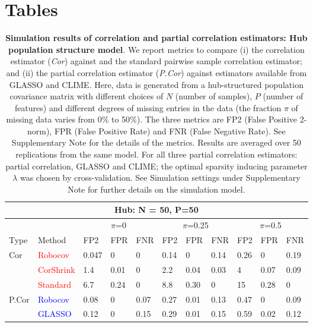 \newpage
\section*{Tables}

\begin{longtable}[c]{|p{1cm}|p{1.5cm}|p{1cm}|p{1.0cm}|p{1.0cm}|p{1.0cm}|p{1.0cm}|p{1.0cm}|p{1.0cm}|p{1.0cm}|p{1.0cm}|}
\caption{\textbf{Simulation results of correlation and partial correlation estimators: Hub population structure model}. We report metrics to compare (i) the  \Robocov{} correlation estimator (\textit{Cor}) against \CorShrink{} and the standard pairwise sample correlation estimator; and (ii) the \Robocov{} partial correlation estimator (\textit{P.Cor})  against estimators available from GLASSO and 
CLIME. Here, data is generated from a hub-structured population covariance matrix with different choices of $N$ (number of samples), $P$ (number of features) and different degrees of missing entries in the data (the fraction $\pi$ of missing data varies from 0$\%$ to 50$\%$). The three metrics are FP2 (False Positive 2-norm), FPR (False Positive Rate) and FNR (False Negative Rate). See Supplementary Note for the details of the metrics. Results are averaged over 50 replications from the same model. For all three partial correlation estimators:  \Robocov{} partial correlation, GLASSO and CLIME; the optimal sparsity inducing parameter $\lambda$ was chosen by cross-validation. See Simulation settings under Supplementary Note for further details on the simulation model.}
\label{tab:tab1} \\ \hline
\multicolumn{11}{|c|}{Hub: N = 50, P=50} \\ \hline
& & \multicolumn{3}{c|}{$\pi$=0} & \multicolumn{3}{c|}{$\pi$=0.25} & \multicolumn{3}{c|}{$\pi$=0.5} \\ \hline
 Type & Method & FP2 & FPR & FNR &  FP2 & FPR & FNR & FP2 & FPR & FNR \\ \hline 
\multirow{ 3}{*}{Cor} & \textcolor{red}{Robocov} & 0.047 &   0 &   0  & 0.14 &   0 & 0.14 & 0.26 &   0 & 0.19 \\
& \textcolor{red}{CorShrink} & 1.4 & 0.01 &  0 & 2.2 & 0.04 & 0.03 &  4 & 0.07 & 0.09 \\
& \textcolor{red}{Standard} & 6.7 & 0.24 &  0  & 8.8 & 0.30 &  0 &  15 & 0.28 & 0 \\  \hline 
\multirow{ 3}{*}{P.Cor} & \textcolor{blue}{Robocov} & 0.08 & 0 & 0.07 & 0.27 & 0.01 & 0.13 & 0.47 & 0 & 0.09 \\
& \textcolor{blue}{GLASSO} & 0.12 & 0 & 0.15 & 0.29 & 0.01 & 0.15 & 0.59 & 0.02 & 0.12 \\

\end{longtable}
